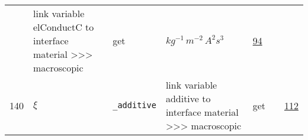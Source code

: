 \begin{longtable}{|p{1cm}|p{2.5cm}|p{4.5cm}|p{8cm}|p{3.0cm}|p{3cm}|p{1cm}|}
             & link variable elConductC to interface material >>> macroscopic
             & \begin{lay}get \end{lay}
             & $ kg^{-1} \,m^{-2} \,A^{2} s^{3} \, $
             & \hyperlink{"e:94"}{ 94 }
                 \\
    140
             & \hypertarget{"v:140"}{ $ {\xi}{_{}} $}
             & \verb|_additive|
             & link variable additive to interface material >>> macroscopic
             & \begin{lay}get \end{lay}
             & $  $
             & \hyperlink{"e:112"}{ 112 }
                 \\
    \end{longtable}